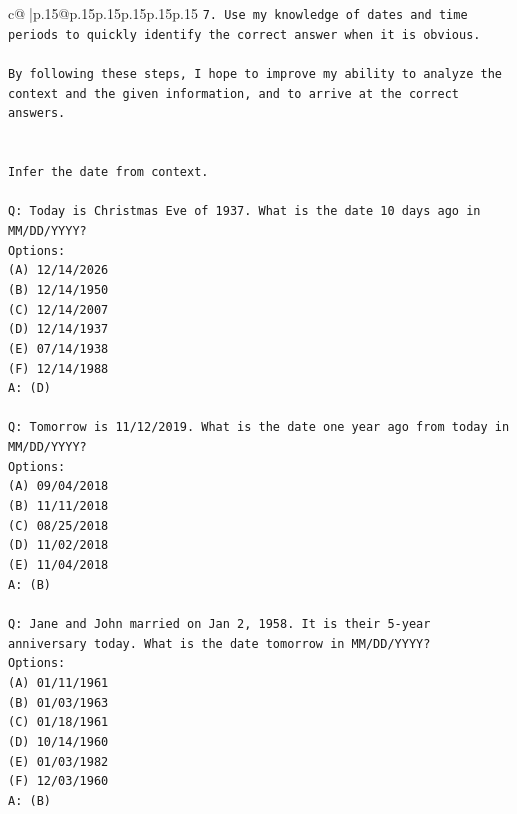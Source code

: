 \documentclass{article}
\begin{document}
{\begin{supertabular}{c@{$\;$}|p{.15\linewidth}@{}p{.15\linewidth}p{.15\linewidth}p{.15\linewidth}p{.15\linewidth}p{.15\linewidth}}
{{{\texttt{7. Use my knowledge of dates and time periods to quickly identify the correct answer when it is obvious.} \\
\\ 
\texttt{By following these steps, I hope to improve my ability to analyze the context and the given information, and to arrive at the correct answers.} \\
\\ 
\\ 
\texttt{Infer the date from context.} \\
\\ 
\texttt{Q: Today is Christmas Eve of 1937. What is the date 10 days ago in MM/DD/YYYY?} \\
\texttt{Options:} \\
\texttt{(A) 12/14/2026} \\
\texttt{(B) 12/14/1950} \\
\texttt{(C) 12/14/2007} \\
\texttt{(D) 12/14/1937} \\
\texttt{(E) 07/14/1938} \\
\texttt{(F) 12/14/1988} \\
\texttt{A: (D)} \\
\\ 
\texttt{Q: Tomorrow is 11/12/2019. What is the date one year ago from today in MM/DD/YYYY?} \\
\texttt{Options:} \\
\texttt{(A) 09/04/2018} \\
\texttt{(B) 11/11/2018} \\
\texttt{(C) 08/25/2018} \\
\texttt{(D) 11/02/2018} \\
\texttt{(E) 11/04/2018} \\
\texttt{A: (B)} \\
\\ 
\texttt{Q: Jane and John married on Jan 2, 1958. It is their 5{-}year anniversary today. What is the date tomorrow in MM/DD/YYYY?} \\
\texttt{Options:} \\
\texttt{(A) 01/11/1961} \\
\texttt{(B) 01/03/1963} \\
\texttt{(C) 01/18/1961} \\
\texttt{(D) 10/14/1960} \\
\texttt{(E) 01/03/1982} \\
\texttt{(F) 12/03/1960} \\
\texttt{A: (B)} \\
}}}
\end{supertabular}}
\end{document}
